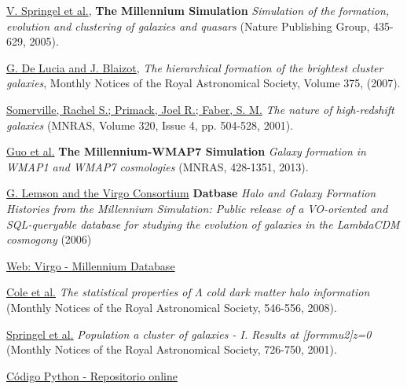 \begin{thebibliography}{9}
\href{https://ui.adsabs.harvard.edu/abs/2005Natur.435..629S/abstract}{V. Springel et al.},
\textbf{The Millennium Simulation}
\textit{Simulation of the formation, evolution and clustering of galaxies and quasars}
(Nature Publishing Group, 435-629, 2005).

\href{https://ui.adsabs.harvard.edu/abs/2007MNRAS.375....2D/abstract}{G. De Lucia and J. Blaizot},
\textit{The hierarchical formation of the brightest cluster galaxies},
Monthly Notices of the Royal Astronomical Society, Volume 375, (2007).

\href{https://ui.adsabs.harvard.edu/abs/2001MNRAS.320..504S/abstract}{Somerville, Rachel S.; Primack, Joel R.; Faber, S. M.} 
\textit{The nature of high-redshift galaxies}
(MNRAS, Volume 320, Issue 4, pp. 504-528, 2001).

\href{https://ui.adsabs.harvard.edu/abs/2013MNRAS.428.1351G/abstract}{Guo et al.} 
\textbf{The Millennium-WMAP7 Simulation}
\textit{Galaxy formation in WMAP1 and WMAP7 cosmologies}
(MNRAS, 428-1351, 2013).

\href{https://ui.adsabs.harvard.edu/abs/2006astro.ph..8019L/abstract}{G. Lemson and the Virgo Consortium} 
\textbf{Datbase}
\textit{Halo and Galaxy Formation Histories from the Millennium Simulation: Public release of a VO-oriented and SQL-queryable database for studying the evolution of galaxies in the LambdaCDM cosmogony}
(2006)

\href{http://gavo.mpa-garching.mpg.de/Millennium/}{Web: Virgo - Millennium Database}

\href{https://ui.adsabs.harvard.edu/abs/2008MNRAS.383..546C/abstract}{Cole et al.} 
\textit{The statistical properties of $\Lambda$ cold dark matter halo information}
(Monthly Notices of the Royal Astronomical Society, 546-556, 2008).

\href{https://ui.adsabs.harvard.edu/abs/2001MNRAS.328..726S/abstract}{Springel et al.} 
\textit{Population a cluster of galaxies - I. Results at [formmu2]z=0}
(Monthly Notices of the Royal Astronomical Society, 726-750, 2001).

\href{https://github.com/Labalor/MillenniumSimulation/}{Código Python - Repositorio online}

\end{thebibliography}

